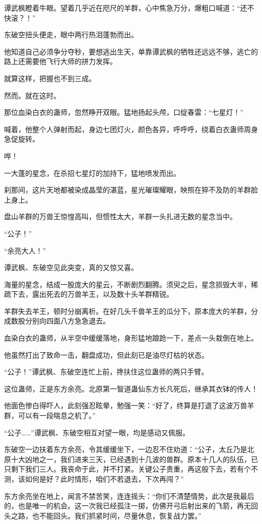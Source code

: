 \begin{this_body}
谭武枫瞪着牛眼。望着几乎近在咫尺的羊群，心中焦急万分，爆粗口喊道：“还不快滚？！”

东破空扭头便走，眼中两行热泪蓬勃而出。

他知道自己必须争分夺秒，要想逃出生天，单靠谭武枫的牺牲还远远不够，逃亡的路上还需要他飞行大师的拼力发挥。

就算这样，把握也不到三成。

然而。就在这时。

那位血染白衣的蛊师，忽然睁开双眼。猛地扬起头颅，口绽春雷：“七星灯！”

喊着，他整个人弹射而起，身边七团灯火，颜色各异，呼呼呼，绕着白衣蛊师周身急促旋转。

哗！

一大蓬的星念，在杀招七星灯的加持下，猛地喷发而出。

刹那间，这片天地都被染成晶莹的湛蓝，星光璀璨耀眼，映照在猝不及防的羊群脸上身上。

盘山羊群的万兽王惊惶高叫，但惯性太大，羊群一头扎进无数的星念当中。

“公子！”

“余亮大人！”

谭武枫、东破空见此突变，真的又惊又喜。

海量的星念，结成一股庞大的星云，不断剧烈翻腾。须臾之后，星念损毁大半，稀疏下去，露出死去的万兽羊王，以及数十头羊群精锐。

羊群失去羊王，顿时分崩离析。在好几头千兽羊王的瓜分下，原本庞大的羊群，分成数股分别向四面八方急急退去。

血染白衣的蛊师，从半空中缓缓落地，身形猛地踉跄一下，差点一头栽倒在地上。

他虽然打出了致命一击，翻盘成功，但此刻已是油尽灯枯的状态。

“公子！”谭武枫、东破空连忙上前，搀扶住这位蛊师的两只手臂。

这位蛊师，正是东方余亮。北原第一智道蛊仙东方长凡死后，继承其衣钵的传人！

他面色惨白得吓人，此刻强忍眩晕，勉强一笑：“好了，终算是打退了这波万兽羊群，可以有一段喘息之机了。”

“公子……”谭武枫、东破空相互对望一眼，均是感动又佩服。

东破空一边扶着东方余亮，令其缓缓坐下，一边忍不住劝道：“公子，太丘乃是北原十大凶地之一，我们进来三天，已经遇到十几波的兽群。原本十几人的队伍，已只剩下我们三人。我丧命于此，并不打紧。关键公子贵重，再这般下去，若有个不测，该如何是好？此时情形，咱们不若退去，下次再闯？”

东方余亮坐在地上，闻言不禁苦笑，连连摇头：“你们不清楚情势，此次是我最后的，也是唯一的机会。这一次我已经孤注一掷，仿佛开弓后射出来的飞箭，再无回头之路，也不能回头。我们抓紧时间，尽量休息，恢复战力罢。”


\end{this_body}
